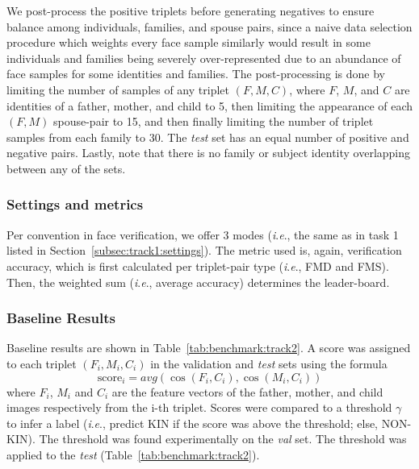 \documentclass[letterpaper, 10 pt, conference]{ieeeconf}  %
\newcommand{\ie}{\textit{i}.\textit{e}., }
\begin{document}
We post-process the positive triplets before generating negatives to ensure balance among individuals, families, and spouse pairs, since a naive data selection procedure which weights every face sample similarly would result in some individuals and families being severely over-represented due to an abundance of face samples for some identities and families. 
The post-processing is done by limiting the number of samples of any triplet $(F, M, C)$, where $F$, $M$, and $C$ are identities of a father, mother, and child to 5, then limiting the appearance of each $(F, M)$ spouse-pair to 15, and then finally limiting the number of triplet samples from each family to 30. The \emph{test} set has an equal number of positive and negative pairs. Lastly, note that there is no family or subject identity overlapping between any of the sets.
%


\subsubsection{Settings and metrics}
Per convention in face verification, we offer 3 modes (\ie the same as in task 1 listed in Section~\ref{subsec:track1:settings}). The metric used is, again, verification accuracy, which is first calculated per triplet-pair type (\ie FMD and FMS). Then, the weighted sum (\ie average accuracy) determines the leader-board.



\subsubsection{Baseline Results}
Baseline results are shown in Table~\ref{tab:benchmark:track2}. A score was assigned to each triplet $(F_i, M_i, C_i)$ in the validation and \emph{test} sets using the formula $$ \text{score}_{i} =  avg(\cos{(F_i, C_i)}, \cos{(M_i, C_i)}) $$
where $F_i$, $M_i$ and $C_i$ are the feature vectors of the father, mother, and child images respectively from the i-th triplet. 
Scores were compared to a threshold $\gamma$ to infer a label (\ie predict KIN if the score was above the threshold; else, NON-KIN). 
The threshold was found experimentally on the \emph{val} set. The threshold was applied to the \emph{test} (Table~\ref{tab:benchmark:track2}).
\end{document}
